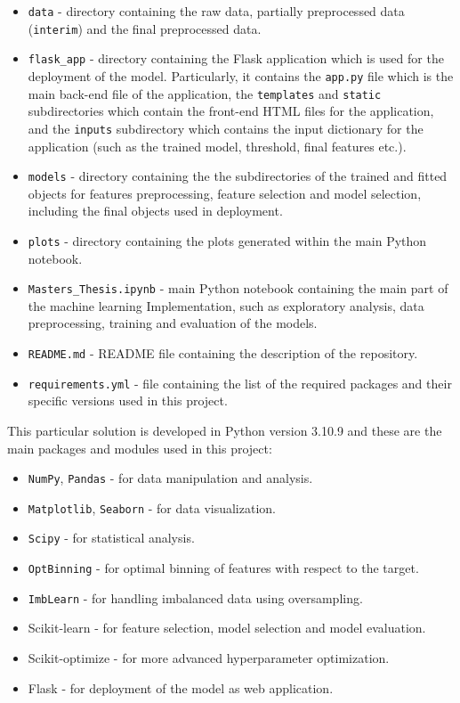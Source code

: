     \begin{itemize}\setlength\itemsep{0em}
        \item \texttt{data} - directory containing the raw data, partially preprocessed data (\texttt{interim}) and the final preprocessed data.
        \item \texttt{flask\_app} - directory containing the Flask application which is used for the deployment of the model. Particularly, it contains the \texttt{app.py} file which is the main back-end file of the application, the \texttt{templates} and \texttt{static} subdirectories which contain the front-end HTML files for the application, and the \texttt{inputs} subdirectory which contains the input dictionary for the application (such as the trained model, threshold, final features etc.).
        \item \texttt{models} - directory containing the the subdirectories of the trained and fitted objects for features preprocessing, feature selection and model selection, including the final objects used in deployment.
        \item \texttt{plots} - directory containing the plots generated within the main Python notebook.
        \item \texttt{Masters\_Thesis.ipynb} - main Python notebook containing the main part of the machine learning Implementation, such as exploratory analysis, data preprocessing, training and evaluation of the models.
        \item \texttt{README.md} - README file containing the description of the repository.
        \item \texttt{requirements.yml} - file containing the list of the required packages and their specific versions used in this project.
    \end{itemize}

    This particular solution is developed in Python version 3.10.9 and these are the main packages and modules used in this project:
    \begin{itemize}\setlength\itemsep{0em}
        \item \lstinline{NumPy}, \lstinline{Pandas} - for data manipulation and analysis.
        \item \lstinline{Matplotlib}, \lstinline{Seaborn} - for data visualization.
        \item \lstinline{Scipy} - for statistical analysis.
        \item \lstinline{OptBinning} - for optimal binning of features with respect to the target.
        \item \lstinline{ImbLearn} - for handling imbalanced data using oversampling.
        \item {Scikit-learn} - for feature selection, model selection and model evaluation.
        \item {Scikit-optimize} - for more advanced hyperparameter optimization.
        \item {Flask} - for deployment of the model as web application.
    \end{itemize}

